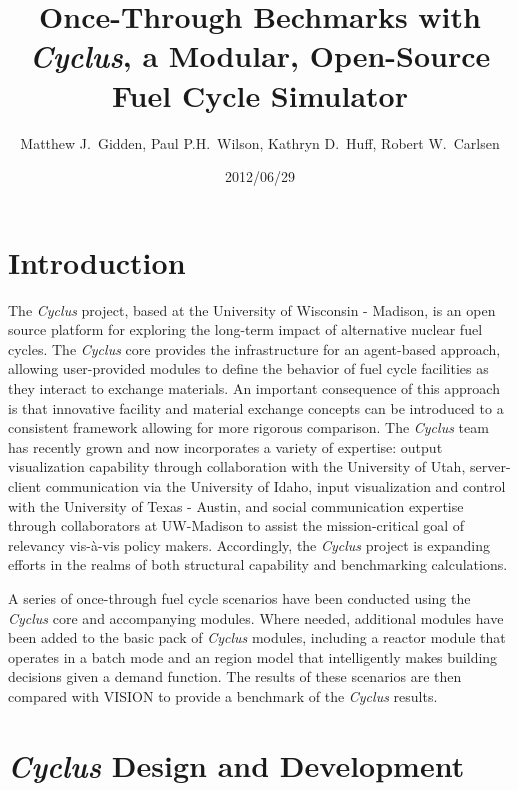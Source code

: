 \documentclass{anstrans}
\title{Once-Through Bechmarks with \emph{Cyclus}, a Modular, Open-Source Fuel Cycle Simulator}
\author{Matthew J.~Gidden, Paul P.H.~Wilson, Kathryn D.~Huff, Robert W.~Carlsen}
\institute{Department of Nuclear Engineering \& Engineering Physics, University of Wisconsin - Madison, Madison, WI, 53703}
\date{2012/06/29}
\begin{document}
\section{Introduction}

The \emph{Cyclus} project, based at the University of Wisconsin -
Madison, is an open source platform for exploring the long-term impact
of alternative nuclear fuel cycles.  The \emph{Cyclus} core provides
the infrastructure for an agent-based approach, allowing user-provided
modules to define the behavior of fuel cycle facilities as they
interact to exchange materials.  An important consequence of this
approach is that innovative facility and material exchange concepts
can be introduced to a consistent framework allowing for more rigorous
comparison.  The \emph{Cyclus} team has recently grown and now
incorporates a variety of expertise: output visualization capability
through collaboration with the University of Utah, server-client
communication via the University of Idaho, input visualization and
control with the University of Texas - Austin, and social
communication expertise through collaborators at UW-Madison to assist
the mission-critical goal of relevancy vis-\`{a}-vis policy
makers. Accordingly, the \emph{Cyclus} project is expanding efforts in
the realms of both structural capability and benchmarking
calculations.

A series of once-through fuel cycle scenarios have been conducted
using the \emph{Cyclus} core and accompanying modules. Where needed,
additional modules have been added to the basic pack of \emph{Cyclus}
modules, including a reactor module that operates in a batch mode and
an region model that intelligently makes building decisions given a
demand function. The results of these scenarios are then compared with
VISION \cite{vision2009} to provide a benchmark of the \emph{Cyclus}
results.


\section{\emph{Cyclus} Design and Development}

\end{document}
